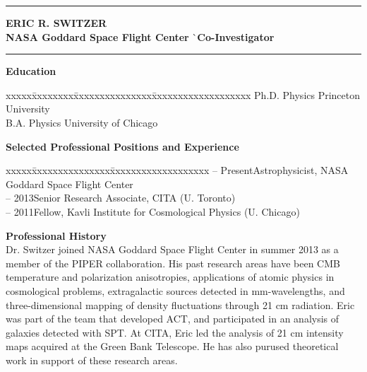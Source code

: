 \documentclass[12pt]{article}
\begin{document}
\hrule height .7pt
\vspace{-3mm}
\noindent
\begin{tabbing}
{\bf ERIC R. SWITZER} \` \\
\small{{\bf NASA Goddard Space Flight Center}} \` \small{{\bf Co-Investigator}} \\
\end{tabbing}
\vspace{-9mm}
\hrule height .7pt

\vspace{5mm}
\small{
\noindent
{\bf Education}
\vspace{-3mm}
\begin{tabbing}
xxxxx\=xxxxxxxx\=xxxxxxxxxxxxxxx\=xxxxxxxxxxxxxxxxxxx\kill
{} \> Ph.D. Physics \> Princeton University \\
 \> B.A. Physics \> University of Chicago \\
\end{tabbing}}

\vspace{-5mm}
\small{
\noindent
{\bf Selected Professional Positions and Experience}
\vspace{-3mm}
\begin{tabbing}
xxxxx\=xxxxxxxxxxxxxxx\=xxxxxxxxxxxxxxxxxxx\kill
{} -- Present\>Astrophysicist, NASA Goddard Space Flight Center \\
 -- 2013\>Senior Research Associate, CITA (U. Toronto) \\
 -- 2011\>Fellow, Kavli Institute for Cosmological Physics (U. Chicago) \\
\end{tabbing}}

\vspace{-2mm}
\small{
\noindent
{\bf Professional History}\\
Dr. Switzer joined NASA Goddard Space Flight Center in summer 2013 as a member
of the PIPER collaboration. His past research areas have been CMB temperature
and polarization anisotropies, applications of atomic physics in cosmological
problems, extragalactic sources detected in mm-wavelengths, and
three-dimensional mapping of density fluctuations through 21 cm radiation. Eric
was part of the team that developed ACT, and participated in an analysis of
galaxies detected with SPT. At CITA, Eric led the analysis of 21 cm intensity
maps acquired at the Green Bank Telescope. He has also purused theoretical work
in support of these research areas.
}

\vspace{5mm}
\begin{list}{}{%
\setlength{\topsep}{0pt}%
\setlength{\leftmargin}{0.1in}%
\setlength{\listparindent}{-0.1in}%
\setlength{\itemindent}{-0.1in}%
\setlength{\parsep}{\parskip}%
}%

\end{list}
\end{document}
